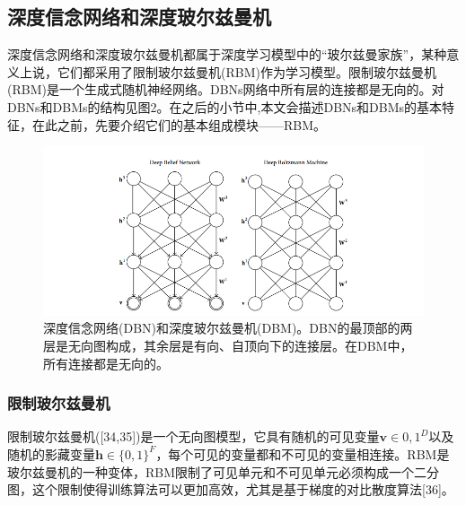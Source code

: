 \documentclass[a4paper]{article}
\begin{document}
\subsection{深度信念网络和深度玻尔兹曼机}
深度信念网络和深度玻尔兹曼机都属于深度学习模型中的“玻尔兹曼家族”，某种意义上说，它们都采用了限制玻尔兹曼机(RBM)作为学习模型。限制玻尔兹曼机(RBM)是一个生成式随机神经网络。DBNs网络中所有层的连接都是无向的。对DBNs和DBMs的结构见图2。在之后的小节中,本文会描述DBNs和DBMs的基本特征，在此之前，先要介绍它们的基本组成模块——RBM。
\begin{figure}[ht]
	\centering
	\includegraphics[scale=0.6]{fig2.png}
	\caption{深度信念网络(DBN)和深度玻尔兹曼机(DBM)。DBN的最顶部的两层是无向图构成，其余层是有向、自顶向下的连接层。在DBM中，所有连接都是无向的。}
	\label{fig:label}
\end{figure}
\subsubsection{限制玻尔兹曼机}
限制玻尔兹曼机([34,35])是一个无向图模型，它具有随机的可见变量$\bm{v}\in {0,1}^{D}$以及随机的影藏变量$\bm{h}\in \{0,1\}^F$，每个可见的变量都和不可见的变量相连接。RBM是玻尔兹曼机的一种变体，RBM限制了可见单元和不可见单元必须构成一个二分图，这个限制使得训练算法可以更加高效，尤其是基于梯度的对比散度算法[36]。
\end{document}
